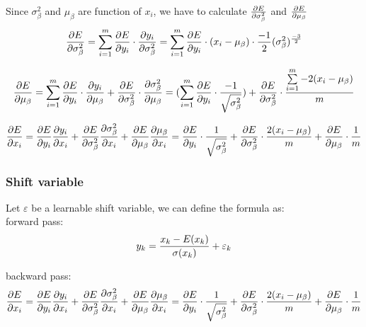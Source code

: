 \documentclass[final]{siamltexmm}
\begin{document}
Since $\sigma^2_\beta$ and $\mu_\beta$ are function of $x_i$, we have to calculate ${\partial E \over \partial \sigma^2_\beta}$ and ${\partial E \over \partial \mu_\beta}$
\begin{equation}
{\partial E \over \partial \sigma^2_\beta}=\sum\limits_{i=1}^{m} {\partial E \over \partial y_i}\cdot {\partial y_i \over \partial \sigma^2_\beta} 
=\sum\limits_{i=1}^{m} {\partial E \over \partial y_i}\cdot (x_i-\mu_\beta) \cdot {-1 \over 2} (\sigma^2_\beta)^{-3 \over 2}
\end{equation}

\begin{equation}
{\partial E \over \partial \mu_\beta}=
\sum\limits_{i=1}^{m} {\partial E \over \partial y_i}\cdot {\partial y_i \over \partial \mu_\beta} + {\partial E \over \partial \sigma^2_\beta} \cdot {\partial \sigma^2_\beta \over \partial \mu_\beta}
=(\sum\limits_{i=1}^{m} {\partial E \over \partial y_i}\cdot {-1 \over {\sqrt{\sigma^2_\beta}}})+ {\partial E \over \partial \sigma^2_\beta} \cdot {{\sum\limits_{i=1}^{m}{-2(x_i-\mu_\beta)}} \over {m}}
\end{equation}

\begin{equation}
{\partial E\over \partial x_i}={\partial E\over \partial y_i} {\partial y_i\over \partial x_i}+{\partial E\over \partial \sigma^2_\beta} {\partial \sigma^2_\beta \over \partial x_i}+{\partial E\over \partial \mu_\beta} {\partial \mu_\beta\over \partial x_i}
={\partial E\over \partial y_i} \cdot {1 \over {\sqrt{\sigma^2_\beta}}}+{\partial E\over \partial \sigma^2_\beta} \cdot {2(x_i-\mu_\beta) \over {m}}+{\partial E\over \partial \mu_\beta}\cdot{1 \over m}
\end{equation}

\subsubsection{Shift variable}
Let $\varepsilon$ be a learnable shift variable, we can define the formula as:\\
forward pass:
\begin{equation}
y_k={x_k-E(x_k)\over {\sigma(x_k)}}+\varepsilon_k
\end{equation}

backward pass:
\begin{equation}
{\partial E\over \partial x_i}={\partial E\over \partial y_i} {\partial y_i\over \partial x_i}+{\partial E\over \partial \sigma^2_\beta} {\partial \sigma^2_\beta \over \partial x_i}+{\partial E\over \partial \mu_\beta} {\partial \mu_\beta\over \partial x_i}
={\partial E\over \partial y_i} \cdot {1 \over {\sqrt{\sigma^2_\beta}}}+{\partial E\over \partial \sigma^2_\beta} \cdot {2(x_i-\mu_\beta) \over {m}}+{\partial E\over \partial \mu_\beta}\cdot{1 \over m}
\end{equation}
\end{document}
